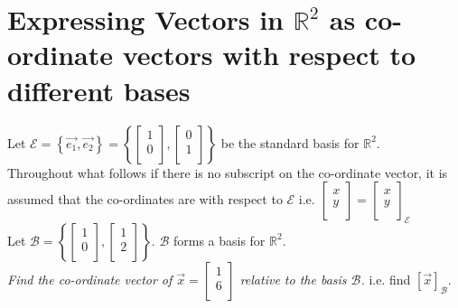 \documentclass{report}
\begin{document}
{   \section{Expressing Vectors in $ \mathbb{R} ^2$ as co-ordinate vectors with respect to different bases}
   Let $ \mathcal{E} = \left\{ \vec{ e_1} , \vec{ e_2}  \right\} = \left\{ \begin{bmatrix}
   1\\
   0\\
   \end{bmatrix}
   , \begin{bmatrix}
   0\\
   1\\
   \end{bmatrix}
    \right\}$ be the standard basis for $ \mathbb{R} ^2$.\\
    Throughout what follows if there is no subscript on the co-ordinate vector, it is assumed that the co-ordinates are with respect to $ \mathcal{E}$ i.e.  $ \begin{bmatrix}
    x\\
    y\\
    \end{bmatrix}
    = \begin{bmatrix}
    x\\
    y\\
    \end{bmatrix}
    _{ \mathcal{E}}$ \\
    Let $ \mathcal{B} = \left\{ \begin{bmatrix}
    1\\
    0\\
    \end{bmatrix}
    , \begin{bmatrix}
    1\\
    2\\
    \end{bmatrix}
    \right\}$. $ \mathcal{B} $ forms a basis for $ \mathbb{R} ^2$.\\
    \textit{Find the co-ordinate vector  of $ \vec{ x} = \begin{bmatrix}
    1\\
    6\\
    \end{bmatrix}
   $ relative to the basis $ \mathcal{B}$.} i.e.  find $  \left[ \vec{ x}  \right] _{ \mathcal{B}}$.\\
  \[
  
\]}
\end{document}
